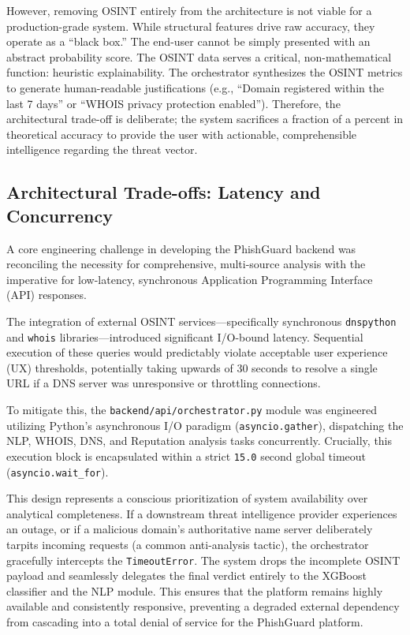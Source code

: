 However, removing OSINT entirely from the architecture is not viable for
a production-grade system. While structural features drive raw accuracy,
they operate as a ``black box.'' The end-user cannot be simply presented
with an abstract probability score. The OSINT data serves a critical,
non-mathematical function: heuristic explainability. The orchestrator
synthesizes the OSINT metrics to generate human-readable justifications
(e.g., ``Domain registered within the last 7 days'' or ``WHOIS privacy
protection enabled''). Therefore, the architectural trade-off is
deliberate; the system sacrifices a fraction of a percent in theoretical
accuracy to provide the user with actionable, comprehensible
intelligence regarding the threat vector.

\subsection{Architectural Trade-offs: Latency and
Concurrency}\label{architectural-trade-offs-latency-and-concurrency}

A core engineering challenge in developing the PhishGuard backend was
reconciling the necessity for comprehensive, multi-source analysis with
the imperative for low-latency, synchronous Application Programming
Interface (API) responses.

The integration of external OSINT services---specifically synchronous
\texttt{dnspython} and \texttt{whois} libraries---introduced significant
I/O-bound latency. Sequential execution of these queries would
predictably violate acceptable user experience (UX) thresholds,
potentially taking upwards of 30 seconds to resolve a single URL if a
DNS server was unresponsive or throttling connections.

To mitigate this, the \texttt{backend/api/orchestrator.py} module was
engineered utilizing Python's asynchronous I/O paradigm
(\texttt{asyncio.gather}), dispatching the NLP, WHOIS, DNS, and
Reputation analysis tasks concurrently. Crucially, this execution block
is encapsulated within a strict \texttt{15.0} second global timeout
(\texttt{asyncio.wait\_for}).

This design represents a conscious prioritization of system availability
over analytical completeness. If a downstream threat intelligence
provider experiences an outage, or if a malicious domain's authoritative
name server deliberately tarpits incoming requests (a common
anti-analysis tactic), the orchestrator gracefully intercepts the
\texttt{TimeoutError}. The system drops the incomplete OSINT payload and
seamlessly delegates the final verdict entirely to the XGBoost
classifier and the NLP module. This ensures that the platform remains
highly available and consistently responsive, preventing a degraded
external dependency from cascading into a total denial of service for
the PhishGuard platform.

